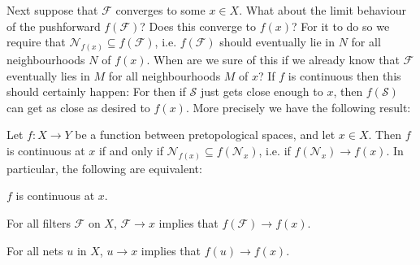 \documentclass[article, a4paper, 11pt, oneside]{memoir}
\numberwithin{equation}{chapter}
\newcommand{\calF}{\mathcal{F}}
\newcommand{\calS}{\mathcal{S}}
\newcommand{\calN}{\mathcal{N}}
\newcommand{\nhoods}[1]{\calN_{#1}}
\begin{document}
Next suppose that $\calF$ converges to some $x \in X$. What about the limit behaviour of the pushforward $f(\calF)$? Does this converge to $f(x)$? For it to do so we require that $\nhoods{f(x)} \subseteq f(\calF)$, i.e. $f(\calF)$ should eventually lie in $N$ for all neighbourhoods $N$ of $f(x)$. When are we sure of this if we already know that $\calF$ eventually lies in $M$ for all neighbourhoods $M$ of $x$? If $f$ is continuous then this should certainly happen: For then if $\calS$ just gets close enough to $x$, then $f(\calS)$ can get as close as desired to $f(x)$. More precisely we have the following result:

\begin{proposition}
    \label{thm:continuity-filter-net}
    Let $f \colon X \to Y$ be a function between pretopological spaces, and let $x \in X$. Then $f$ is continuous at $x$ if and only if $\nhoods{f(x)} \subseteq f(\nhoods{x})$, i.e. if $f(\nhoods{x}) \to f(x)$. In particular, the following are equivalent:
    \begin{enumprop}
        \item \label{enum:continuity-point} $f$ is continuous at $x$.
        \item \label{enum:filter-convergence-point} For all filters $\calF$ on $X$, $\calF \to x$ implies that $f(\calF) \to f(x)$.
        \item \label{enum:net-convergence-point} For all nets $u$ in $X$, $u \to x$ implies that $f(u) \to f(x)$.
    \end{enumprop}
\end{proposition}
\end{document}
